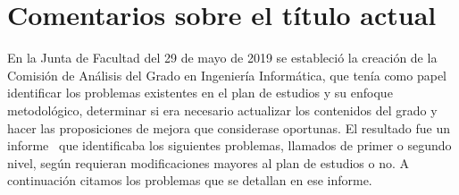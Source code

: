 \chapter{Comentarios sobre el título actual}\label{chap:analysis}


En la Junta de Facultad del 29 de mayo de 2019
se estableció la creación de
la Comisión de Análisis del Grado en Ingeniería Informática,
que tenía como papel
identificar los problemas existentes en
el plan de estudios y su enfoque metodológico,
determinar si era necesario actualizar los contenidos del grado y
hacer las proposiciones de mejora que considerase oportunas.
El resultado fue un informe~\cite{analysis-comission}
que identificaba los siguientes problemas,
llamados de primer o segundo nivel,
según requieran modificaciones mayores al plan de estudios o no.
A continuación citamos los problemas que se detallan en ese informe.

